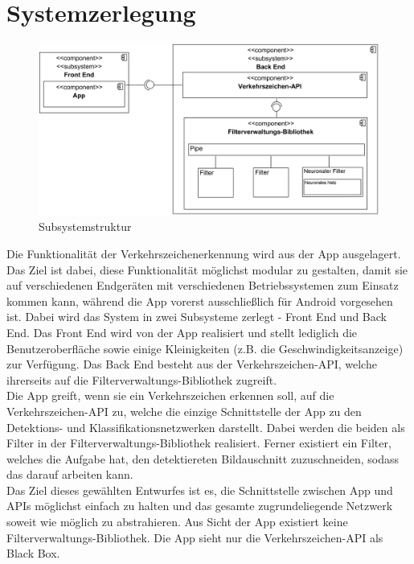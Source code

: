 \documentclass[12pt,a4paper,ngerman,enabledeprecatedfontcommands]{scrreprt}
\begin{document}
\section{Systemzerlegung}

\begin{figure}[H]
\centering
\includegraphics[width=1\linewidth]{Grafiken/component_diagram_neu.png}
\caption{Subsystemstruktur}
\end{figure}
\label{sec:subsystemstruktur}

Die Funktionalität der Verkehrszeichenerkennung wird aus der \gls{App} ausgelagert. Das Ziel ist dabei, diese Funktionalität möglichst modular zu gestalten, damit sie auf verschiedenen Endgeräten mit verschiedenen Betriebssystemen zum Einsatz kommen kann, während die \gls{App} vorerst ausschließlich für Android vorgesehen ist. Dabei wird das \gls{System} in zwei Subsysteme zerlegt - Front End und Back End. Das Front End wird von der \gls{App} realisiert und stellt lediglich die Benutzeroberfläche sowie einige Kleinigkeiten (z.B. die Geschwindigkeitsanzeige) zur Verfügung. Das Back End besteht aus der \gls{Verkehrszeichen-API}, welche ihrerseits auf die  \gls{Filterverwaltungs-Bibliothek}  zugreift.\\
Die \gls{App} greift, wenn sie ein Verkehrszeichen erkennen soll, auf die \gls{Verkehrszeichen-API} zu, welche die einzige Schnittstelle der \gls{App} zu den \gls{Detektion}s- und \gls{Klassifikation}snetzwerken darstellt. Dabei werden die beiden  als \gls{Filter} in der \gls{Filterverwaltungs-Bibliothek} realisiert. Ferner existiert ein  \gls{Filter}, welches die Aufgabe hat, den detektiereten Bildauschnitt zuzuschneiden, sodass das  darauf arbeiten kann.\\
Das Ziel dieses gewählten Entwurfes ist es, die Schnittstelle zwischen \gls{App} und \gls{API}s möglichst einfach zu halten und das gesamte zugrundeliegende Netzwerk soweit wie möglich zu abstrahieren. Aus Sicht der \gls{App} existiert keine \gls{Filterverwaltungs-Bibliothek}. Die \gls{App} \glqq{}sieht\grqq{} nur die \gls{Verkehrszeichen-API} als Black Box.\\
\end{document}
